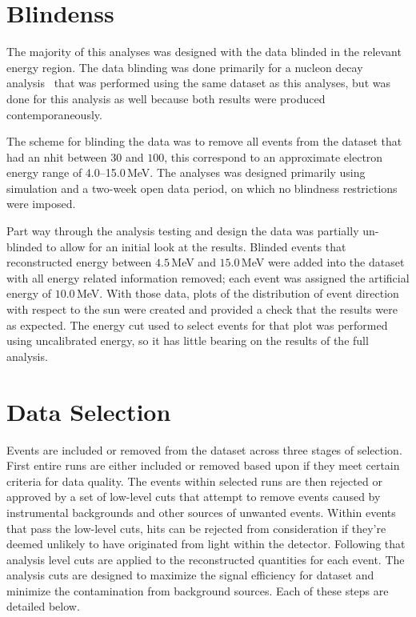\section{Blindenss}
The majority of this analyses was designed with the data blinded in the
relevant energy region.
The data blinding was done primarily for a nucleon decay analysis~\citep{ND_PAPER}
that was performed using the same dataset as this analyses, but was done
for this analysis as well because both results were produced contemporaneously.

The scheme for blinding the data was to remove all events from the dataset that
had an nhit between $30$ and $100$, this correspond to an approximate electron energy
range of \numrange{4.0}{15.0}\,MeV.
The analyses was designed primarily using simulation and a two-week open
data period, on which no blindness restrictions were imposed.

Part way through the analysis testing and design the data was partially un-blinded
to allow for an initial look at the results.
Blinded events that reconstructed energy between $4.5$\,MeV and $15.0$\,MeV
were added into the dataset with all energy related information removed;
each event was assigned the artificial energy of $10.0$\,MeV.
With those data, plots of the distribution of event direction with respect to
the sun were created and provided a check that the results were as expected.
The energy cut used to select events for that plot was performed using
uncalibrated energy, so it has little bearing on the results of the full
analysis.

\section{Data Selection}
\label{sec:data_selection}
Events are included or removed from the dataset across three stages of selection.
First entire runs are either included or removed based upon if they meet
certain criteria for data quality.
The events within selected runs are then rejected or approved by a set
of low-level cuts that attempt to remove events caused by instrumental
backgrounds and other sources of unwanted events.
Within events that pass the low-level cuts, hits can be rejected from consideration
if they're deemed unlikely to have originated from light within the detector.
Following that analysis level cuts are applied to the reconstructed quantities
for each event.
The analysis cuts are designed to maximize the signal efficiency for dataset and minimize the
contamination from background sources.
Each of these steps are detailed below.

